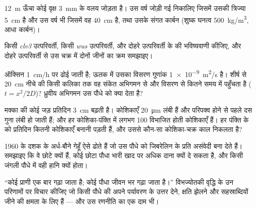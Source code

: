 \begin{exercise}[$\star\star$]\label{exo:b2:plant-meristems:7}
\qty{12}{m} ऊँचा कोई वृक्ष \qty{3}{mm} के वलय जोड़ता है। उस वर्ष जोड़ी
गई  निकालिए जिसमें उसकी त्रिज्या \qty{5}{cm} है और उस वर्ष भी
जिसमें वह \qty{40}{cm} है, तथा उसके संगत कार्बन (शुष्क घनत्व
\qty{500}{kg/m^3}, आधा कार्बन)।
\end{exercise}

\begin{exercise}[$\star\star$]\label{exo:b2:plant-meristems:8}
किसी \emph{clv3} उत्परिवर्ती, किसी \emph{wus} उत्परिवर्ती, और दोहरे
उत्परिवर्ती के  की भविष्यवाणी कीजिए, और दोहरे उत्परिवर्ती
से उस चक्र में दोनों जीनों का क्रम समझाइए।
\end{exercise}

\begin{exercise}[$\star\star$]\label{exo:b2:plant-meristems:9}
ऑक्सिन \qty{1}{cm/h} पर ढोई जाती है; ऊतक में उसका विसरण गुणांक
\qty{1e-9}{m^2/s} है। शीर्ष से \qty{20}{cm} नीचे की किसी कलिका तक वह
संकेत अभिगमन से और विसरण से कितने समय में पहुँचता है
($t = x^2/2D$)? ध्रुवीय अभिगमन उस पौधे को क्या देता है?
\end{exercise}

\begin{exercise}[$\star\star\star$]\label{exo:b2:plant-meristems:10}
मक्का की कोई जड़ प्रतिदिन \qty{3}{cm} बढ़ती है।  कोशिकाएँ
\qty{20}{\micro m} लंबी हैं और परिपक्व होने से पहले दस गुना लंबी हो जाती
हैं; और हर कोशिका-पंक्ति में लगभग \num{100} विभाजित होती कोशिकाएँ हैं।
हर पंक्ति के  को प्रतिदिन कितनी कोशिकाएँ बनानी पड़ती हैं, और
उससे कौन-सा कोशिका-चक्र काल निकलता है?
\end{exercise}

\begin{exercise}[$\star\star\star$]\label{exo:b2:plant-meristems:11}
1960 के दशक के अर्ध-बौने गेहूँ ऐसे  ढोते हैं जो उस
पौधे को जिबरेलिन के प्रति असंवेदी बना देते हैं। समझाइए कि वे छोटे क्यों
हैं, कोई छोटा पौधा भारी खाद पर अधिक दाना क्यों दे सकता है, और
किसी जंगली पौधे में वही  हानि क्यों होता।
\end{exercise}

\begin{exercise}[$\star\star\star$]\label{exo:b2:plant-meristems:12}
``कोई प्राणी एक बार गढ़ा जाता है; कोई पौधा जीवन भर गढ़ा जाता है।''
विभज्योतकी वृद्धि के उन परिणामों पर विचार कीजिए जो किसी पौधे की अपने
पर्यावरण के उत्तर देने, क्षति झेलने और सहस्राब्दियों जीने की क्षमता के
लिए हैं --- और उस रणनीति का एक दाम भी।
\end{exercise}

